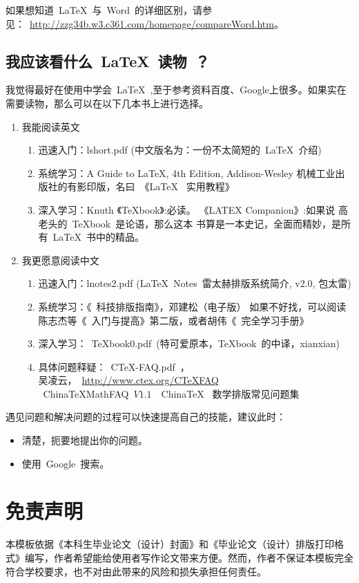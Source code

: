 如果想知道~\LaTeX~与~Word~的详细区别，请参见：~\url{http://zzg34b.w3.c361.com/homepage/compareWord.htm}。

\subsection{我应该看什么~\LaTeX~读物~？}

我觉得最好在使用中学会~\LaTeX~,至于参考资料百度、Google上很多。如果实在需要读物，那么可以在以下几本书上进行选择。

\begin{enumerate}
\item 我能阅读英文
\begin{enumerate}
\item 迅速入门：lshort.pdf (中文版名为：一份不太简短的~\LaTeX{}~介绍)
\item 系统学习：A Guide to LaTeX, 4th Edition, Addison-Wesley
                机械工业出版社的有影印版，名曰~《\LaTeX{}~ 实用教程》
\item 深入学习：Knuth 《TeXbook》:必读。 《LATEX Companion》:如果说 高老头的~TeXbook~是论语，那么这本
               书算是一本史记，全面而精妙，是所有~\LaTeX~书中的精品。
\end{enumerate}

\item 我更愿意阅读中文
\begin{enumerate}
\item 迅速入门：lnotes2.pdf (\LaTeX~Notes~雷太赫排版系统简介, v2.0, 包太雷)
\item 系统学习：《\LaTeXe{}~科技排版指南》，邓建松（电子版）
      如果不好找，可以阅读陈志杰等《\LaTeXe~入门与提高》第二版，或者胡伟《\LaTeXe~完全学习手册》
\item 深入学习：~TeXbook0.pdf~(特可爱原本，TeXbook~的中译，xianxian)
\item 具体问题释疑：~CTeX-FAQ.pdf~，\\
        吴凌云，~\url{http://www.ctex.org/CTeXFAQ}~\\
      ~ChinaTeXMathFAQ~$V1.1$~~China\TeX~ 数学排版常见问题集
\end{enumerate}
\end{enumerate}

遇见问题和解决问题的过程可以快速提高自己的技能，建议此时：
\begin{itemize}
 \item 清楚，扼要地提出你的问题。
 \item 使用~Google~搜索。
\end{itemize}

\section{免责声明}

本模板依据《本科生毕业论文（设计）封面》和《毕业论文（设计）排版打印格式》编写，作者希望能给使用者写作论文带来方便。然而，作者不保证本模板完全符合学校要求，也不对由此带来的风险和损失承担任何责任。
